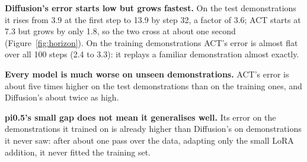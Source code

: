 \textbf{Diffusion's error starts low but grows fastest.} On the test
demonstrations it rises from 3.9 at the first step to 13.9 by step 32, a factor
of 3.6; ACT starts at 7.3 but grows by only 1.8, so the two cross at about one
second (Figure~\ref{fig:horizon}). On the training demonstrations ACT's error is
almost flat over all 100 steps (2.4 to 3.3): it replays a familiar
demonstration almost exactly.

\textbf{Every model is much worse on unseen demonstrations.} ACT's error is
about five times higher on the test demonstrations than on the training ones,
and Diffusion's about twice as high. 

\textbf{pi0.5's small gap does not mean it generalises well.} Its error on
the demonstrations it trained on is already higher than Diffusion's on
demonstrations it never saw: after about one pass over the data, adapting only
the small LoRA addition, it never fitted the training set. 

